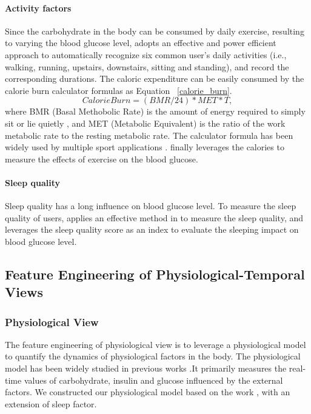 \paragraph{Activity factors}
Since the carbohydrate in the body can be consumed by daily exercise, resulting to varying the blood glucose level, \sysname adopts an effective and power efficient approach \cite{bib:kwapisz2011activity} to automatically recognize six common user's daily activities (i.e., walking, running, upstairs, downstairs, sitting and standing), and record the corresponding durations. The caloric expenditure can be easily consumed by the calorie burn calculator formulas as Equation ~\ref{calorie_burn}.
\begin{equation}\label{calorie_burn}
  Calorie Burn = (BMR/24)*MET*T,
\end{equation}
where BMR (Basal Methobolic Rate) is the amount of energy required to simply sit or lie quietly \cite{bib:mcnab1997utility}, and MET (Metabolic Equivalent) is the ratio of the work metabolic rate to the resting metabolic rate\cite{bib:ainsworth2000compendium}. The calculator formula has been widely used by multiple sport applications \cite{bib:shapesense, bib:HealthStatus, bib:CalorieCounter}.
\sysname finally leverages the calories to measure the effects of exercise on the blood glucose.

\paragraph{Sleep quality}
Sleep quality has a long influence on blood glucose level. To measure the sleep quality of users, \sysname applies an effective method in \cite{bib:gu2014intelligent} to measure the sleep quality, and leverages the sleep quality score as an index to evaluate the sleeping impact on blood glucose level.

\subsection{Feature Engineering of Physiological-Temporal Views }
\subsubsection{Physiological View}
The feature engineering of physiological view is to leverage a physiological model to quantify the dynamics of physiological factors in the body. The physiological model has been widely studied in previous works \cite{bib:briegel2002nonlinear,bib:duke2010intelligent, bib:plis2014machine}.It primarily measures the real-time values of carbohydrate, insulin and glucose influenced by the external factors. We constructed our physiological model based on the work \cite{bib:duke2010intelligent}, 
with an extension of sleep factor.  

